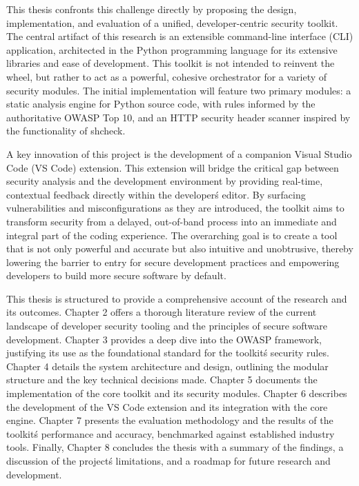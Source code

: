 This thesis confronts this challenge directly by proposing the design, implementation, and evaluation of a unified, developer-centric security toolkit. The central artifact of this research is an extensible command-line interface (CLI) application, architected in the Python programming language for its extensive libraries and ease of development. This toolkit is not intended to reinvent the wheel, but rather to act as a powerful, cohesive orchestrator for a variety of security modules. The initial implementation will feature two primary modules: a static analysis engine for Python source code, with rules informed by the authoritative OWASP Top 10, and an HTTP security header scanner inspired by the functionality of shcheck.

A key innovation of this project is the development of a companion Visual Studio Code (VS Code) extension. This extension will bridge the critical gap between security analysis and the development environment by providing real-time, contextual feedback directly within the developer\'s editor. By surfacing vulnerabilities and misconfigurations as they are introduced, the toolkit aims to transform security from a delayed, out-of-band process into an immediate and integral part of the coding experience. The overarching goal is to create a tool that is not only powerful and accurate but also intuitive and unobtrusive, thereby lowering the barrier to entry for secure development practices and empowering developers to build more secure software by default.

This thesis is structured to provide a comprehensive account of the research and its outcomes. Chapter 2 offers a thorough literature review of the current landscape of developer security tooling and the principles of secure software development. Chapter 3 provides a deep dive into the OWASP framework, justifying its use as the foundational standard for the toolkit\'s security rules. Chapter 4 details the system architecture and design, outlining the modular structure and the key technical decisions made. Chapter 5 documents the implementation of the core toolkit and its security modules. Chapter 6 describes the development of the VS Code extension and its integration with the core engine. Chapter 7 presents the evaluation methodology and the results of the toolkit\'s performance and accuracy, benchmarked against established industry tools. Finally, Chapter 8 concludes the thesis with a summary of the findings, a discussion of the project\'s limitations, and a roadmap for future research and development.